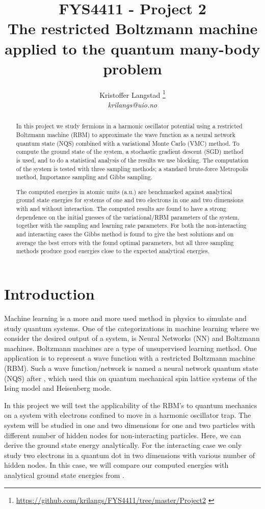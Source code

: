 \documentclass[12pt,a4paper,english]{article}
\title{FYS4411 - Project 2\\ The restricted Boltzmann machine applied to the quantum many-body problem}
\date{}
\author{ Kristoffer Langstad \footnote{\url{https://github.com/krilangs/FYS4411/tree/master/Project2} \cite{GitHub}}\\ \textit{krilangs@uio.no}}
\begin{document}
\maketitle
\begin{abstract}
In this project we study fermions in a harmonic oscillator potential using a restricted Boltzmann machine (RBM) to approximate the wave function as a neural network quantum state (NQS) combined with a variational Monte Carlo (VMC) method. To compute the ground state of the system, a stochastic gradient descent (SGD) method is used, and to do a statistical analysis of the results we use blocking. The computation of the system is tested with three sampling methods; a standard brute-force Metropolis method, Importance sampling and Gibbs sampling.

The computed energies in atomic units (a.u.) are benchmarked against analytical ground state energies for systems of one and two electrons in one and two dimensions with and without interaction. The computed results are found to have a strong dependence on the initial guesses of the variational/RBM parameters of the system, together with the sampling and learning rate parameters. For both the non-interacting and interacting cases the Gibbs method is found to give the best solutions and on average the best errors with the found optimal parameters, but all three sampling methods produce good energies close to the expected analytical energies. 
\end{abstract}


\section{Introduction}
\label{sect:Introduction}
Machine learning is a more and more used method in physics to simulate and study quantum systems. One of the categorizations in machine learning where we consider the desired output of a system, is Neural Networks (NN) and Boltzmann machines. Boltzmann machines are a type of unsupervised learning method. One application is to represent a wave function with a restricted Boltzmann machine (RBM). Such a wave function/network is named a neural network quantum state (NQS) after \citet{carleo2017solving}, which used this on quantum mechanical spin lattice systems of the Ising model and Heisenberg mode.

In this project we will test the applicability of the RBM's to quantum mechanics on a system with electrons confined to move in a harmonic oscillator trap. The system will be studied in one and two dimensions for one and two particles with different number of hidden nodes for non-interacting particles. Here, we can derive the ground state energy analytically. For the interacting case we only study two electrons in a quantum dot in two dimensions with various number of hidden nodes. In this case, we will compare our computed energies with analytical ground state energies from \citet{taut1993two}.
\end{document}
